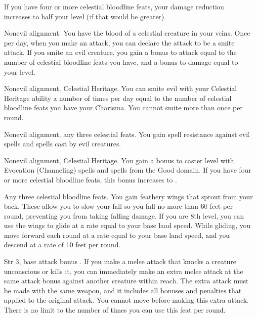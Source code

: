 If you have four or more celestial bloodline feats, your damage reduction increases to half your level (if that would be greater).

 Nonevil alignment.
 You have the blood of a celestial creature in your veins. Once per day, when you make an attack, you can declare the attack to be a smite attack. If you smite an evil creature, you gain a bonus to attack equal to the number of celestial bloodline feats you have, and a bonus to damage equal to your level.

 Nonevil alignment, Celestial Heritage.
 You can smite evil with your Celestial Heritage ability a number of times per day equal to the number of celestial bloodline feats you have \add your Charisma. You cannot smite more than once per round.

 Nonevil alignment, any three celestial feats.
 You gain spell resistance against evil spells and spells cast by evil creatures.

 Nonevil alignment, Celestial Heritage.
 You gain a  bonus to caster level with Evocation (Channeling) spells and spells from the Good domain. If you have four or more celestial bloodline feats, this bonus increases to .

 Any three celestial bloodline feats.
 You gain feathery wings that sprout from your back. These allow you to slow your fall so you fall no more than 60 feet per round, preventing you from taking falling damage. If you are 8th level, you can use the wings to glide at a rate equal to your base land speed. While gliding, you move forward each round at a rate equal to your base land speed, and you descend at a rate of 10 feet per round.

 Str 3, base attack bonus .
 If you make a melee attack that knocks a creature unconscious or kills it, you can immediately make an extra melee attack at the same attack bonus against another creature within reach. The extra attack must be made with the same weapon, and it includes all bonuses and penalties that applied to the original attack. You cannot move before making this extra attack. There is no limit to the number of times you can use this feat per round.

